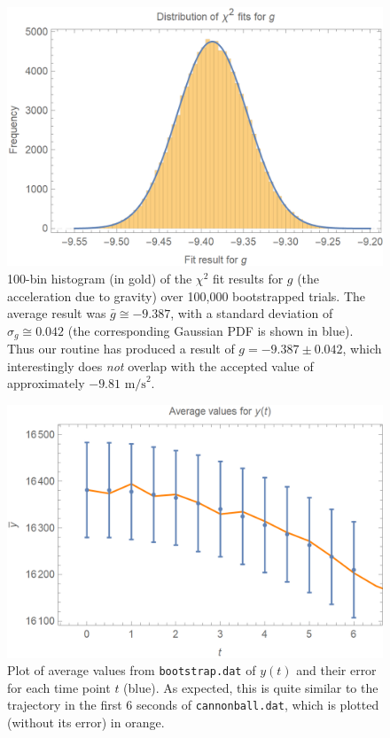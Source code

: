 \documentclass{article}
\begin{document}
\newpage

\bigskip
{}
\medskip

\begin{figure}[H]
    \centering
    \includegraphics[width=4.5in]{homework7/g_hist.png}
    \caption{100-bin histogram (in gold) of the $\chi^2$ fit results for $g$ (the acceleration due to gravity) over 100,000 bootstrapped trials. The average result was $\bar{g}\cong-9.387$, with a standard deviation of $\sigma_g\cong0.042$ (the corresponding Gaussian PDF is shown in blue). Thus our routine has produced a result of $g=-9.387\pm0.042$, which interestingly does \emph{not} overlap with the accepted value of approximately $-9.81\text{ m/s}^2$.}
    \label{fig:g}
\end{figure}

\bigskip
{}
\medskip

\begin{figure}[H]
    \centering
    \includegraphics[width=4.5in]{homework7/yt_plot.png}
    \caption{Plot of average values from \texttt{bootstrap.dat} of $y(t)$ and their error for each time point $t$ (blue). As expected, this is quite similar to the trajectory in the first 6 seconds of \texttt{cannonball.dat}, which is plotted (without its error) in orange.}
    \label{fig:task1}
\end{figure}
\end{document}
